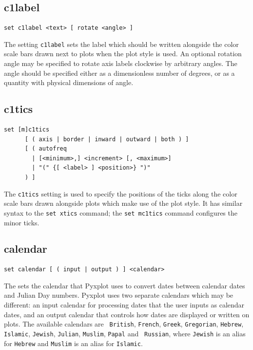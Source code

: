 \subsection{c1label}

\begin{verbatim}
set c1label <text> [ rotate <angle> ]
\end{verbatim}

The setting {\tt c1label} sets the label which should be written alongside the
color scale bars drawn next to plots when the  plot style
is used. An optional rotation angle may be specified to rotate axis labels
clockwise by arbitrary angles. The angle should be specified either as a
dimensionless number of degrees, or as a quantity with physical dimensions of
angle.


\subsection{c1tics}

\begin{verbatim}
set [m]c1tics
      [ ( axis | border | inward | outward | both ) ]
      [ ( autofreq
        | [<minimum>,] <increment> [, <maximum>]
        | "(" {[ <label> ] <position>} ")"
      ) ]
\end{verbatim}

The {\tt c1tics} setting is used to specify the positions of the ticks along
the color scale bars drawn alongside plots which make use of the
 plot style. It has similar syntax to the {\tt set xtics}
command; the {\tt set mc1tics} command configures the minor ticks.


\subsection{calendar}

\begin{verbatim}
set calendar [ ( input | output ) ] <calendar>
\end{verbatim}

The  sets the calendar that Pyxplot uses to convert dates
between calendar dates and Julian Day numbers. Pyxplot uses two separate
calendars which may be different: an input calendar for processing dates that
the user inputs as calendar dates, and an output calendar that controls how
dates are displayed or written on plots.  The available calendars are {\tt
British}, {\tt French}, {\tt Greek}, {\tt Gregorian}, {\tt Hebrew}, {\tt
Islamic}, {\tt Jewish}, {\tt Julian}, {\tt Muslim}, {\tt Papal} and {\tt
Russian}, where {\tt Jewish} is an alias for {\tt Hebrew} and {\tt Muslim} is
an alias for {\tt Islamic}.


